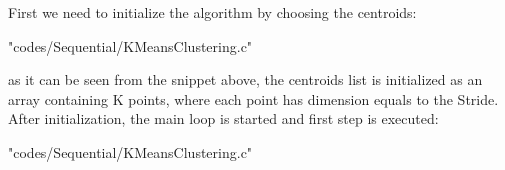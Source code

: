 \documentclass[10pt,twocolumn,letterpaper]{article}
\begin{document}
First we need to initialize the algorithm by choosing the centroids:\\

\begin{lstinputlisting}[language=C,style=CSnippetStyle,caption=Centroids Initialization,firstline=54,lastline=61 ]{
	"codes/Sequential/KMeansClustering.c"}
\end{lstinputlisting}

as it can be seen from the snippet above, the centroids list is initialized as an array containing K points, where each point has 
dimension equals to the Stride.\\

After initialization, the main loop is started and first step is executed:\\

\begin{lstinputlisting}[language=C,style=CSnippetStyle,caption=Minimum Distance Calculation,firstline=69,lastline=78 ]{
	"codes/Sequential/KMeansClustering.c"}
\end{lstinputlisting}
\end{document}

